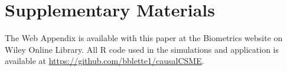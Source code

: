 \documentclass[useAMS,usenatbib,referee]{biom}
\begin{document}






\section*{Supplementary Materials}

The Web Appendix is available with this paper at the Biometrics website on Wiley Online Library. All R code used in the simulations and application is available at \href{https://github.com/bblette1/causalCSME}{https://github.com/bblette1/causalCSME}.\vspace*{-8pt}

\label{lastpage}
\end{document}
